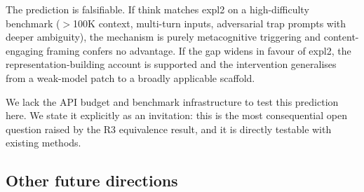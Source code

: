 \documentclass[11pt,a4paper]{article}
\begin{document}
The prediction is falsifiable.  If \textsf{think} matches \textsf{expl2}
on a high-difficulty benchmark ($>$100K context, multi-turn inputs, adversarial
trap prompts with deeper ambiguity), the mechanism is purely metacognitive
triggering and content-engaging framing confers no advantage.  If the gap
widens in favour of \textsf{expl2}, the representation-building account is
supported and the intervention generalises from a weak-model patch to a
broadly applicable scaffold.

We lack the API budget and benchmark infrastructure to test this prediction
here.  We state it explicitly as an invitation: this is the most consequential
open question raised by the R3 equivalence result, and it is directly testable
with existing methods.

\subsection{Other future directions}
\label{sec:future}
\end{document}
